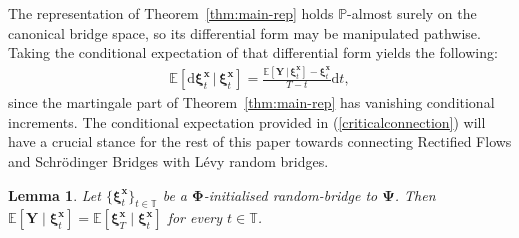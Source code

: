 \documentclass{article}
\newtheorem{lem}[thm]{Lemma}
\newcommand{\levy}{{L\'evy }}
\newcommand{\Schrodinger}{Schr\"odinger\xspace}
\def\P{\mathbb{P}}
\def\E{\mathbb{E}}
\def\T{\mathbb{T}}
\def\dd{\mathrm{d}}
\def\xib{\boldsymbol{\xi}}
\theoremstyle{definition}
\begin{document}
The representation of Theorem~\ref{thm:main-rep} holds $\P$-almost surely on the canonical bridge space, so its differential form may be manipulated pathwise. Taking the conditional expectation of that differential form yields the following:
\begin{align}
\E\left[\dd \xib^{\boldsymbol{x}}_{t} \,|\, \xib^{\boldsymbol{x}}_{t} \right] = \frac{  \E\left[ \boldsymbol{Y} \, | \, \xib^{\boldsymbol{x}}_t \right]  - \xib^{\boldsymbol{x}}_t }{T-t}\dd t, \label{criticalconnection}
\end{align}
since the martingale part of Theorem~\ref{thm:main-rep} has vanishing conditional increments. The conditional expectation provided in (\ref{criticalconnection}) will have a crucial stance for the rest of this paper towards connecting Rectified Flows and \Schrodinger Bridges with \levy random bridges.
\begin{lem}
\label{refconditional}
Let $\{\xib^{\boldsymbol{x}}_t\}_{t\in\T}$ be a $\boldsymbol{\Phi}$-initialised random-bridge to $\boldsymbol{\Psi}$. Then $\mathbb{E}[\boldsymbol{Y} \mid \boldsymbol{\xi}^{\boldsymbol{x}}_t] = \mathbb{E}[\boldsymbol{\xi}^{\boldsymbol{x}}_T \mid \boldsymbol{\xi}^{\boldsymbol{x}}_t]$
for every $t\in\T$.
\end{lem}
\end{document}
